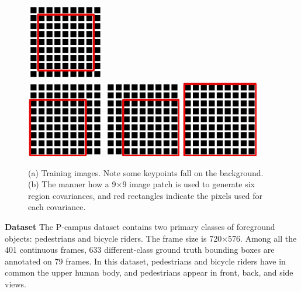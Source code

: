 \begin{figure}
{{\begin{minipage}[b]{0.47\textwidth}
\includegraphics[width=0.3\textwidth,bb=0 0 149 149]{dst5.jpg}  \\
\includegraphics[width=0.3\textwidth,bb=0 0 149 149]{dst2.jpg}
\includegraphics[width=0.3\textwidth,bb=0 0 149 149]{dst4.jpg}
\includegraphics[width=0.3\textwidth,bb=0 0 149 149]{dst1.jpg}
\end{minipage}
}
\label{fig:train:b}
}
\caption[Images for training]{(a) Training images. Note some keypoints fall on the background. (b) The manner how a 9$\times$9 image patch is used to generate six region covariances, and red rectangles indicate the pixels used for each covariance.}
\label{fig:train}
\end{figure}

\textbf{Dataset} The P-campus dataset contains two primary classes of foreground objects: pedestrians and bicycle riders. The frame size is 720$\times$576. Among all the 401 continuous frames, 633 different-class ground truth bounding boxes are annotated on 79 frames. In this dataset, pedestrians and bicycle riders have in common the upper human body, and pedestrians appear in front, back, and side views.

